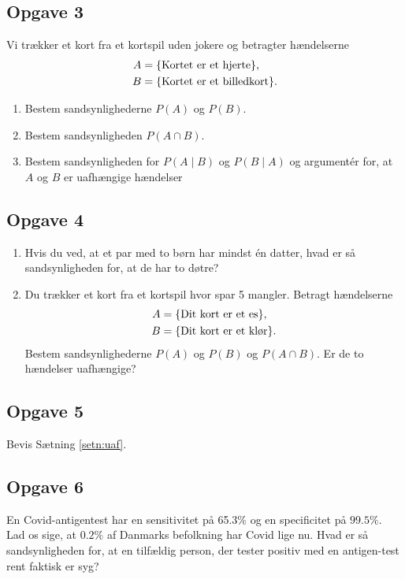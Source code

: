 \subsection*{Opgave 3}

Vi trækker et kort fra et kortspil uden jokere og betragter hændelserne
\begin{align*}
	A &= \{\textnormal{Kortet er et hjerte}\}, \\
	B &= \{\textnormal{Kortet er et billedkort} \}.
\end{align*}
\begin{enumerate}[label=\roman*)]
	\item Bestem sandsynlighederne $P(A)$ og $P(B)$.
	\item Bestem sandsynligheden $P(A \cap B)$. 
	\item Bestem sandsynligheden for $P(A \mid B)$ og $P(B \mid A)$ og argumentér for, at $A$ og $B$ er uafhængige hændelser
\end{enumerate}

\subsection*{Opgave 4}
\begin{enumerate}[label=\roman*)]
	\item Hvis du ved, at et par med to børn har mindst én datter, hvad er så sandsynligheden for, at de har to døtre?
	\item Du trækker et kort fra et kortspil hvor spar 5 mangler. Betragt hændelserne
	\begin{align*}
		A &= \{\textnormal{Dit kort er et es}\},\\
		B &= \{\textnormal{Dit kort er et klør}\}.
	\end{align*}
	Bestem sandsynlighederne $P(A)$ og $P(B)$ og $P(A \cap B)$. Er de to hændelser uafhængige?
\end{enumerate}



\subsection*{Opgave 5}
Bevis Sætning \ref{setn:uaf}.


\subsection*{Opgave 6}

En Covid-antigentest har en sensitivitet på 65.3$\%$ og en specificitet på $99.5\%$. Lad os sige, at $0.2\%$ af Danmarks befolkning har Covid lige nu. Hvad er så sandsynligheden for, at en tilfældig person, der tester positiv med en antigen-test rent faktisk er syg?

